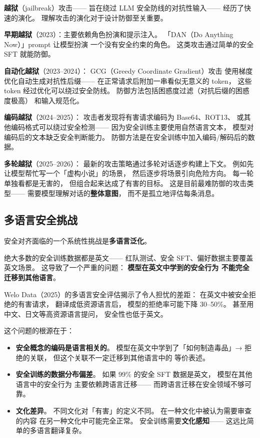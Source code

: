 \textbf{越狱}（jailbreak）攻击——
旨在绕过 LLM 安全防线的对抗性输入——
经历了快速的演化。
理解攻击的演化对于设计防御至关重要。

\textbf{早期越狱}（2023）：主要依赖角色扮演和提示注入。
「DAN（Do Anything Now）」prompt 让模型扮演
一个没有安全约束的角色。
这类攻击通过简单的安全 SFT 就能防御。

\textbf{自动化越狱}（2023--2024）：
GCG（Greedy Coordinate Gradient）攻击
使用梯度优化自动生成对抗性后缀——
在正常请求后附加一串看似无意义的 token，
这些 token 经过优化可以绕过安全防线。
防御方法包括困惑度过滤（对抗后缀的困惑度极高）
和输入规范化。

\textbf{编码越狱}（2024--2025）：
攻击者发现将有害请求编码为 Base64、ROT13、
或其他编码格式可以绕过安全检测——
因为安全训练主要使用自然语言文本，
模型对编码后的文本缺乏安全判断能力。
防御方法是在安全训练中加入编码/解码后的数据。

\textbf{多轮越狱}（2025--2026）：
最新的攻击策略通过多轮对话逐步构建上下文。
例如先让模型帮忙写一个「虚构小说」的场景，
然后逐步将场景引向危险方向。
每一轮单独看都是无害的，
但组合起来达成了有害的目标。
这是目前最难防御的攻击类型——
需要模型理解对话的\textbf{整体意图}，
而不是孤立地评估每条消息。

\subsection{多语言安全挑战}

安全对齐面临的一个系统性挑战是\textbf{多语言泛化}。

绝大多数的安全训练数据都是英文——
红队测试、安全 SFT、偏好数据主要覆盖英文场景。
这导致了一个严重的问题：
\textbf{模型在英文中学到的安全行为
不能完全迁移到其他语言}。

Welo Data（2025）的多语言安全评估揭示了令人担忧的差距：
在英文中被安全拒绝的有害请求，
翻译成低资源语言后，
模型的拒绝率可能下降 30--50\%。
甚至用中文、日文等高资源语言提问，
安全性也低于英文。

这个问题的根源在于：
\begin{itemize}[noitemsep]
  \item \textbf{安全概念的编码是语言相关的}。
        模型在英文中学到了「如何制造毒品」→ 拒绝的关联，
        但这个关联不一定迁移到其他语言中的
        等价表述。
  \item \textbf{安全训练的数据分布偏差}。
        如果 99\% 的安全 SFT 数据是英文，
        模型在其他语言中的安全行为
        主要依赖跨语言迁移——
        而跨语言迁移在安全领域不够可靠。
  \item \textbf{文化差异}。
        不同文化对「有害」的定义不同。
        在一种文化中被认为需要审查的内容
        在另一种文化中可能完全正常。
        安全训练需要\textbf{文化感知}——
        这远比简单的多语言翻译复杂。
\end{itemize}

